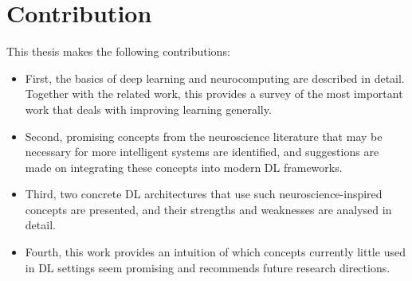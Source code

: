 



\section{Contribution}
This thesis makes the following contributions:
\begin{itemize}
	\item First, the basics of deep learning and neurocomputing are described in detail. Together with the related work, this provides a survey of the most important work that deals with improving learning generally.
	\item Second, promising concepts from the neuroscience literature that may be necessary for more intelligent systems are identified, and suggestions are made on integrating these concepts into modern DL frameworks.
	\item Third, two concrete DL architectures that use such neuroscience-inspired concepts are presented, and their strengths and weaknesses are analysed in detail.
	\item Fourth, this work provides an intuition of which concepts currently little used in DL settings seem promising and recommends future research directions.
\end{itemize}


